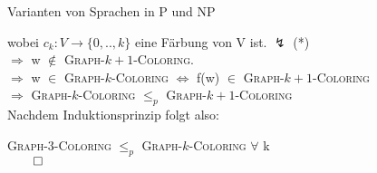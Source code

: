 \documentclass[answers]{submit}
\begin{document}
\begin{exercise}[7]{Varianten von Sprachen in P und NP}
{    wobei $c_{k}: V \rightarrow \{0,..,k\}$ eine Färbung von V ist. $\lightning$ (*) \\

    $\Rightarrow$ w $\notin$ \textsc{Graph-$k+1$-Coloring}. \\

    $\Rightarrow$ w $\in$ \textsc{Graph-$k$-Coloring} $\iff$ f(w) $\in $ \textsc{Graph-$k+1$-Coloring} \\

    $\Rightarrow$ \textsc{Graph-$k$-Coloring} $\leq_p$ \textsc{Graph-$k+1$-Coloring} \\

    Nachdem Induktionsprinzip folgt also:

    \textsc{Graph-$3$-Coloring} $\leq_p$ \textsc{Graph-$k$-Coloring} $\forall$ k \\ $\qed$

  }
\end{exercise}
\end{document}
